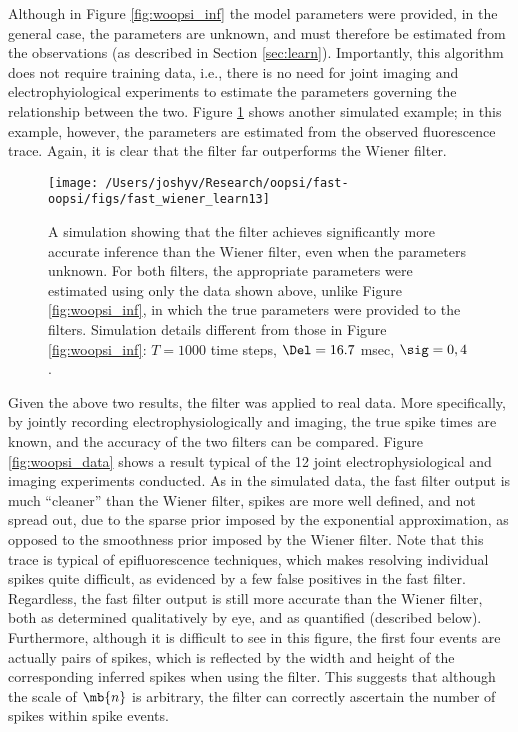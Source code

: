 Although in Figure \ref{fig:woopsi_inf} the model parameters were provided, in the general case, the parameters are unknown, and must therefore be estimated from the observations (as described in Section \ref{sec:learn}). Importantly, this algorithm does not require training data, i.e., there is no need for joint imaging and electrophyiological experiments to estimate the parameters governing the relationship between the two.  Figure \ref{fig:woopsi_learn} shows another simulated example; in this example, however, the parameters are estimated from the observed fluorescence trace.  Again, it is clear that the \foopsi filter far outperforms the Wiener filter.

\begin{figure}[h!]
\centering \texttt{[image: /Users/joshyv/Research/oopsi/fast-oopsi/figs/fast\_wiener\_learn13]}
\caption[parameters may be estimated using the \foopsi filter]{A simulation showing that the \foopsi filter achieves significantly more accurate inference than the Wiener filter, even when the parameters unknown.  For both filters, the appropriate parameters were estimated using only the data shown above, unlike Figure \ref{fig:woopsi_inf}, in which the true parameters were provided to the filters. Simulation details different from those in Figure \ref{fig:woopsi_inf}: $T=1000$ time steps, $\Del=16.7$ msec, $\sig=0,4$.} \label{fig:woopsi_learn}
\end{figure}

Given the above two results, the \foopsi filter was applied to real data.  More specifically, by jointly recording electrophysiologically and imaging, the true spike times are known, and the accuracy of the two filters can be compared.  Figure \ref{fig:woopsi_data} shows a result typical of the 12 joint electrophysiological and imaging experiments conducted. As in the simulated data, the fast filter output is much ``cleaner'' than the Wiener filter, spikes are more well defined, and not spread out, due to the sparse prior imposed by the exponential approximation, as opposed to the smoothness prior imposed by the Wiener filter.  Note that this trace is typical of epifluorescence techniques, which makes resolving individual spikes quite difficult, as evidenced by a few false positives in the fast filter.  Regardless, the fast filter output is still more accurate than the Wiener filter, both as determined qualitatively by eye, and as quantified (described below).  Furthermore, although it is difficult to see in this figure, the first four events are actually pairs of spikes, which is reflected by the width and height of the corresponding inferred spikes when using the \foopsi filter. %
This suggests that although the scale of $\mb{n}$ is arbitrary, the \foopsi filter can correctly ascertain the number of spikes within spike events.  

